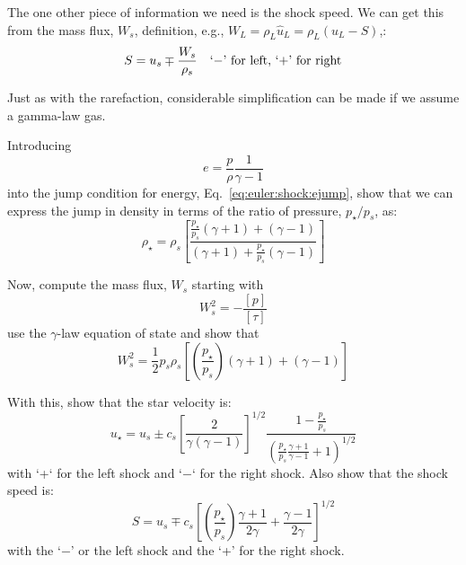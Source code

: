 The one other piece of information we need is the shock speed.  We can
get this from the mass flux, $W_s$, definition, e.g., $W_L = \rho_L
\hat{u}_L = \rho_L (u_L - S)$,:
\begin{equation}
S = u_s \mp \frac{W_s}{\rho_s} \quad\mbox{`$-$' for left, `+' for right}\\
\end{equation}

Just as with the rarefaction, considerable simplification can be made if 
we assume a gamma-law gas.

\begin{exercise}
{
Introducing 
\begin{equation}
e = \frac{p}{\rho} \frac{1}{\gamma -1}
\end{equation}
into the jump condition for energy, Eq.~\ref{eq:euler:shock:ejump},
show that we can express the jump in density in terms of the
ratio of pressure, $p_\star/p_s$, as:
\begin{equation}
\rho_\star = \rho_s \left [ \frac{ \frac{p_\star}{p_s} (\gamma + 1) + (\gamma - 1)}
   {(\gamma + 1) + \frac{p_\star}{p_s} (\gamma -1)} \right ]
\end{equation}
}

Now, compute the mass flux, $W_s$ starting with
\begin{equation}
W_s^2 = -\frac{[p]}{[\tau]}
\end{equation}
use the $\gamma$-law equation of state and show that
\begin{equation}
W_s^2 = \frac{1}{2} p_s \rho_s \left [ \left(\frac{p_\star}{p_s}\right) (\gamma + 1) + (\gamma -1) \right ]
\end{equation}

With this, show that the star velocity is:
\begin{equation}
u_\star = u_s \pm c_s \left [\frac{2}{\gamma(\gamma - 1)}\right]^{1/2} \frac{1 - \frac{p_\star}{p_s}}{\left ( \frac{p_\star}{p_s} \frac{\gamma + 1}{\gamma - 1} + 1\right)^{1/2}}
\end{equation}
with `+` for the left shock and `$-$` for the right shock.
Also show that the shock speed is:
\begin{equation}
S = u_s \mp c_s \left [ \left ( \frac{p_\star}{p_s} \right ) \frac{\gamma+1}{2\gamma} + \frac{\gamma-1}{2\gamma} \right ]^{1/2}
\end{equation}
with the `$-$' or the left shock and the `+' for the right shock.
\end{exercise}
  
